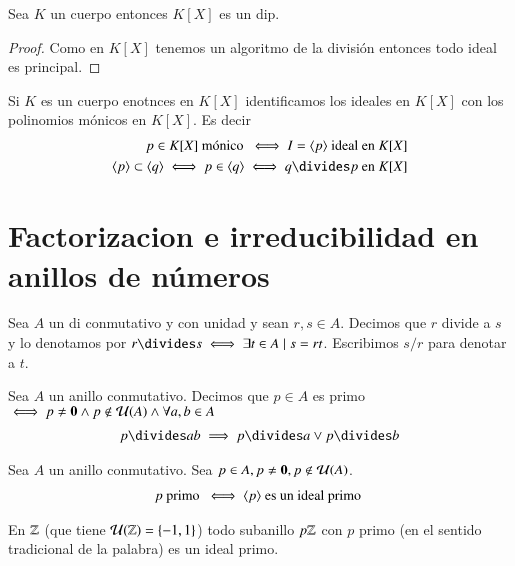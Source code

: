 \begin{pro}
	Sea $K$ un cuerpo entonces $K[X]$ es un \gls{dip}.
\end{pro}

\begin{proof}
	Como en $K[X]$ tenemos un algoritmo de la división entonces todo ideal es principal.
\end{proof}

\begin{cor}
	Si $K$ es un cuerpo enotnces en $K[X]$ identificamos los ideales en $K[X]$ con los polinomios mónicos en $K[X]$. Es decir
	\begin{align*}
		p \in K[X] \text{ mónico } \iff I = \gen{p} \text{ ideal en } K[X] \\
		\gen{p} \subset \gen{q} \iff p \in \gen{q} \iff q \divides p \text{ en } K[X]
	\end{align*}
\end{cor}

\section{Factorizacion e irreducibilidad en anillos de números}

\begin{dfn}[Divisibilidad]
	Sea $A$ un \gls{di} conmutativo y con unidad y sean $r,s \in A$. Decimos que $r$ divide a $s$ y lo denotamos por $r \divides s \iff \exists t \in A \mid s = rt$. Escribimos $s/r$ para denotar a $t$.
\end{dfn}

\begin{dfn}[Primo] %
	Sea $A$ un anillo conmutativo. Decimos que $p \in A$ es primo $\iff p \neq \mathbf{0} \land p \notin \mathcal{U}(A) \land \forall a,b \in A$
	\begin{align*}
	p \divides ab \implies p \divides a \lor p \divides b
	\end{align*}
\end{dfn}

\begin{pro}
	Sea $A$ un anillo conmutativo. Sea $p \in A, p \neq \mathbf{0}, p \notin \mathcal{U}(A)$.
	\begin{align*}
	p \text{ primo } \iff \langle p\rangle \text{ es un ideal primo }
	\end{align*}
\end{pro}

\begin{ej}
	En $\mathbb{Z}$ (que tiene $\mathcal{U}(\mathbb{Z}) = \{-1, 1\}$) todo subanillo $p\mathbb{Z}$ con $p$ primo (en el sentido tradicional de la palabra) es un ideal primo.
\end{ej}

